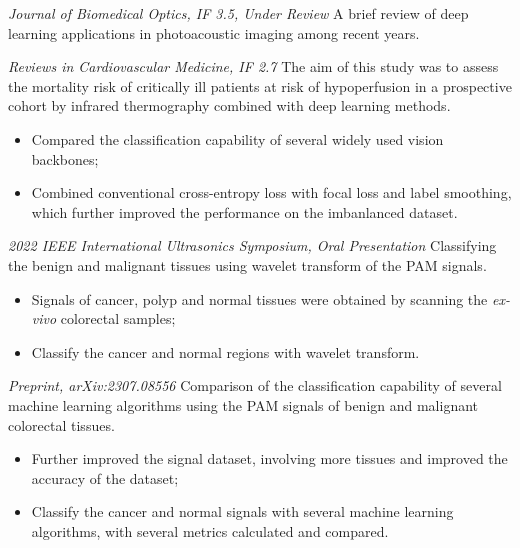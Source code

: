 \documentclass{resume}
\begin{document}
\textit{Journal of Biomedical Optics, IF 3.5, Under Review}
A brief review of deep learning applications in photoacoustic imaging among recent years.

\textit{Reviews in Cardiovascular Medicine, IF 2.7}
The aim of this study was to assess the mortality risk of critically ill patients at risk of hypoperfusion in a prospective cohort by infrared thermography combined with deep learning methods.
\begin{itemize}
  \item Compared the classification capability of several widely used vision backbones;
  \item Combined conventional cross-entropy loss with focal loss and label smoothing, which further improved the performance on the imbanlanced dataset.
\end{itemize}

\textit{2022 IEEE International Ultrasonics Symposium, Oral Presentation}
Classifying the benign and malignant tissues using wavelet transform of the PAM signals.
\begin{itemize}
  \item Signals of cancer, polyp and normal tissues were obtained by scanning the \textit{ex-vivo} colorectal samples;
  \item Classify the cancer and normal regions with wavelet transform.
\end{itemize}

\textit{Preprint, arXiv:2307.08556}
Comparison of the classification capability of several machine learning algorithms using the PAM signals of benign and malignant colorectal tissues.
\begin{itemize}
  \item Further improved the signal dataset, involving more tissues and improved the accuracy of the dataset;
  \item Classify the cancer and normal signals with several machine learning algorithms, with several metrics calculated and compared.
\end{itemize}
\end{document}
